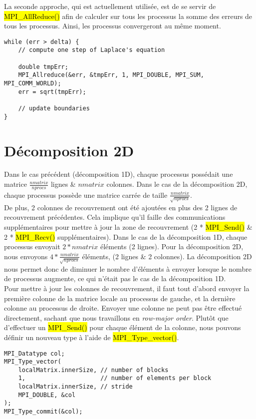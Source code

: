 \documentclass[a4paper,table]{article}
\begin{document}
La seconde approche, qui est actuellement utilisée, est de se servir de
\hl{MPI\_AllReduce()} afin de calculer sur tous les processus la somme des
erreurs de tous les processus. Ainsi, les processus convergeront au même
moment.

\begin{lstlisting}
while (err > delta) {
	// compute one step of Laplace's equation
	
    double tmpErr;
    MPI_Allreduce(&err, &tmpErr, 1, MPI_DOUBLE, MPI_SUM, MPI_COMM_WORLD);
    err = sqrt(tmpErr);
	
	// update boundaries
}
\end{lstlisting}

\section{Décomposition 2D}

Dans le cas précédent (décomposition 1D), chaque processus possédait une matrice
$\frac{nmatrix}{nprocs}$ lignes \& $nmatrix$ colonnes. Dans le cas de la
décomposition 2D, chaque processus possède une matrice carrée de taille
$\frac{nmatrix}{\sqrt{nprocs}}$.\\

De plus, 2 colonnes de recouvrement ont été ajoutées en plus des 2 lignes de
recouvrement précédentes. Cela implique qu'il faille des communications
supplémentaires pour mettre à jour la zone de recouvrement (2 * \hl{MPI\_Send()}
\& 2 * \hl{MPI\_Recv()} supplémentaires). Dans le cas de la décomposition 1D,
chaque processus envoyait $2 * nmatrix$ éléments (2 lignes). Pour la
décomposition 2D, nous envoyons $4 * \frac{nmatrix}{\sqrt{nprocs}}$ éléments,
(2 lignes \& 2 colonnes). La décomposition 2D nous permet donc de diminuer le
nombre d'éléments à envoyer lorsque le nombre de processus augmente, ce qui
n'était pas le cas de la décomposition 1D.\\

Pour mettre à jour les colonnes de recouvrement, il faut tout d'abord envoyer
la première colonne de la matrice locale au processus de gauche, et la dernière
colonne au processus de droite. Envoyer une colonne ne peut pas être effectué
directement, sachant que nous travaillons en \emph{row-major order}. Plutôt que
d'effectuer un \hl{MPI\_Send()} pour chaque élément de la colonne, nous pouvons
définir un nouveau type à l'aide de \hl{MPI\_Type\_vector()}.\\
\newpage

\begin{lstlisting}
MPI_Datatype col;
MPI_Type_vector(
    localMatrix.innerSize, // number of blocks
    1,                     // number of elements per block
    localMatrix.innerSize, // stride
    MPI_DOUBLE, &col
);
MPI_Type_commit(&col);
\end{lstlisting}
\
\end{document}

